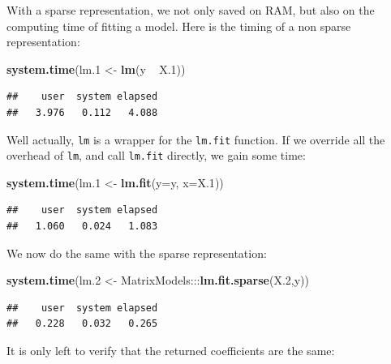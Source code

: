 \documentclass[]{book}
\newenvironment{Shaded}{\begin{snugshade}}{\end{snugshade}}
\newcommand{\KeywordTok}[1]{\textcolor[rgb]{0.13,0.29,0.53}{\textbf{{#1}}}}
\newcommand{\DataTypeTok}[1]{\textcolor[rgb]{0.13,0.29,0.53}{{#1}}}
\newcommand{\FloatTok}[1]{\textcolor[rgb]{0.00,0.00,0.81}{{#1}}}
\newcommand{\StringTok}[1]{\textcolor[rgb]{0.31,0.60,0.02}{{#1}}}
\newcommand{\NormalTok}[1]{{#1}}
\theoremstyle{definition}
\theoremstyle{definition}
\theoremstyle{remark}
\begin{document}
With a sparse representation, we not only saved on RAM, but also on the
computing time of fitting a model. Here is the timing of a non sparse
representation:

\begin{Shaded}
\begin{Highlighting}[]
\KeywordTok{system.time}\NormalTok{(lm}\FloatTok{.1} \NormalTok{<-}\StringTok{ }\KeywordTok{lm}\NormalTok{(y ~}\StringTok{ }\NormalTok{X}\FloatTok{.1}\NormalTok{)) }
\end{Highlighting}
\end{Shaded}

\begin{verbatim}
##    user  system elapsed 
##   3.976   0.112   4.088
\end{verbatim}

Well actually, \texttt{lm} is a wrapper for the \texttt{lm.fit}
function. If we override all the overhead of \texttt{lm}, and call
\texttt{lm.fit} directly, we gain some time:

\begin{Shaded}
\begin{Highlighting}[]
\KeywordTok{system.time}\NormalTok{(lm}\FloatTok{.1} \NormalTok{<-}\StringTok{ }\KeywordTok{lm.fit}\NormalTok{(}\DataTypeTok{y=}\NormalTok{y, }\DataTypeTok{x=}\NormalTok{X}\FloatTok{.1}\NormalTok{))}
\end{Highlighting}
\end{Shaded}

\begin{verbatim}
##    user  system elapsed 
##   1.060   0.024   1.083
\end{verbatim}

We now do the same with the sparse representation:

\begin{Shaded}
\begin{Highlighting}[]
\KeywordTok{system.time}\NormalTok{(lm}\FloatTok{.2} \NormalTok{<-}\StringTok{ }\NormalTok{MatrixModels:::}\KeywordTok{lm.fit.sparse}\NormalTok{(X}\FloatTok{.2}\NormalTok{,y))}
\end{Highlighting}
\end{Shaded}

\begin{verbatim}
##    user  system elapsed 
##   0.228   0.032   0.265
\end{verbatim}

It is only left to verify that the returned coefficients are the same:
\end{document}
